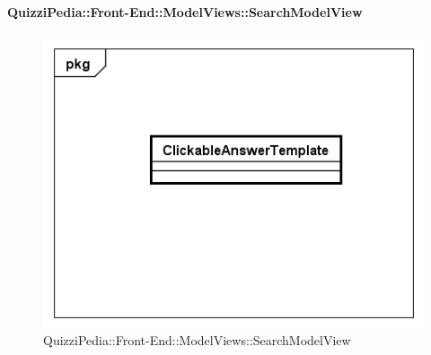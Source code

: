 	\paragraph{QuizziPedia::Front-End::ModelViews::SearchModelView}
	
	\label{QuizziPedia::Front-End::ModelViews::SearchModelView}
	
	\begin{figure}[ht]
		\centering
		\includegraphics[scale=0.5,keepaspectratio]{UML/Classi/Front-End/QuizziPedia_Front-end_Templates_ClickableAnswerTemplate.png}
		\caption{QuizziPedia::Front-End::ModelViews::SearchModelView}
	\end{figure} \FloatBarrier
	
